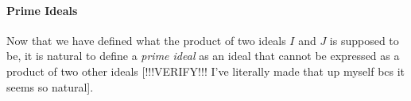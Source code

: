 %
%
%
%

\paragraph{Prime Ideals} Now that we have defined what the product of two ideals $I$ and $J$ is supposed to be, it is natural to define a \emph{prime ideal} as an ideal that cannot be expressed as a product of two other ideals [!!!VERIFY!!! I've literally made that up myself bcs it seems so natural].

%

